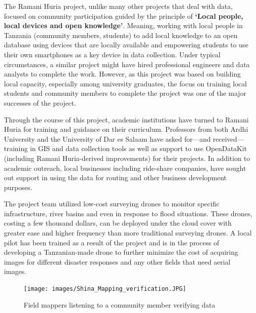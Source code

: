 \documentclass[a4paper,12pt,twoside]{article}
\begin{document}
\begin{multicols}{2}

The Ramani Huria project, unlike many other projects that deal with data, focused on community participation guided by the principle of \textbf{‘Local people, local devices and open knowledge'}. Meaning,  working with local people in Tanzania (community members, students) to add local knowledge to an open database using devices that are locally available and empowering students to use  their own smartphones as a key device in data collection. Under typical circumstances, a similar project might have hired professional engineers and data analysts to complete the work. However, as this project was based on building local capacity, especially among university graduates, the focus on training local students and community members to complete the project was one of the major successes of the project.

Through the course of this project, academic institutions have turned to Ramani Huria for training and guidance on their curriculum. Professors from both Ardhi University and the University of Dar es Salaam have asked for—and received—training in GIS and data collection tools as well as support to use OpenDataKit (including Ramani Huria-derived improvements) for their projects. In addition to academic outreach, local businesses including ride-share companies, have sought out support in using the data for routing and other business development purposes. 

The project team utilized low-cost surveying drones to monitor specific infrastructure, river basins and even in response to flood situations. These drones, costing a few thousand dollars, can be deployed under the cloud cover with greater ease and higher frequency than more traditional surveying drones.   A local pilot has been trained as a result of the project and is in the process of developing a Tanzanian-made drone to further minimize the cost of acquiring images for different disaster responses and any other fields that need aerial images.
\end{multicols}
\begin{figure}[h]
    \centering
    \texttt{[image: images/Shina\_Mapping\_verification.JPG]}
    \caption{Field mappers listening to a community member verifying data}
\end{figure}
\end{document}
